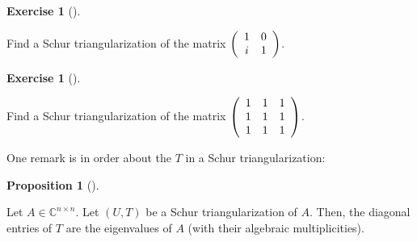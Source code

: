 \documentclass[numbers=enddot,12pt,final,onecolumn,notitlepage]{scrartcl}%
\newcounter{exer}
\numberwithin{exer}{subsection}
\theoremstyle{definition}
\newtheorem{prop}[theo]{Proposition}
\newenvironment{proposition}[1][]
{\begin{prop}[#1]\begin{leftbar}}
{\end{leftbar}\end{prop}}
\newtheorem{exmp}[exer]{Exercise}
\newenvironment{exercise}[1][]
{\begin{exmp}[#1]\begin{leftbar}}
{\end{leftbar}\end{exmp}}
\begin{document}
\begin{exercise}
\label{exe.schurtri.schurtri.one2x2} Find a Schur triangularization of
the matrix $\left(
\begin{array}
[c]{cc}%
1 & 0\\
i & 1
\end{array}
\right)  $.
\end{exercise}

\begin{exercise}
\label{exe.schurtri.schurtri.one3x3} Find a Schur triangularization of
the matrix $\left(
\begin{array}
[c]{ccc}%
1 & 1 & 1\\
1 & 1 & 1\\
1 & 1 & 1
\end{array}
\right)  $.
\end{exercise}

One remark is in order about the $T$ in a Schur triangularization:

\begin{proposition}
\label{prop.schurtri.schurtri.T-diag}Let $A\in\mathbb{C}^{n\times n}$. Let
$\left(  U,T\right)  $ be a Schur triangularization of $A$. Then, the diagonal
entries of $T$ are the eigenvalues of $A$ (with their algebraic multiplicities).
\end{proposition}
\end{document}
